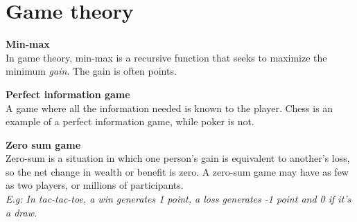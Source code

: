 \section{Game theory}

\textbf{Min-max} \\
In game theory, min-max is a recursive function that seeks to maximize the minimum \textit{gain}. The gain is often points. 

\textbf{Perfect information game} \\
A game where all the information needed is known to the player. Chess is an example of a perfect information game, while poker is not. 

\textbf{Zero sum game} \\
Zero-sum is a situation in which one person's gain is equivalent to another's loss, so the net change in wealth or benefit is zero. A zero-sum game may have as few as two players, or millions of participants. \\
\textit{E.g: In tac-tac-toe, a win generates 1 point, a loss generates -1 point and 0 if it's a draw.}


